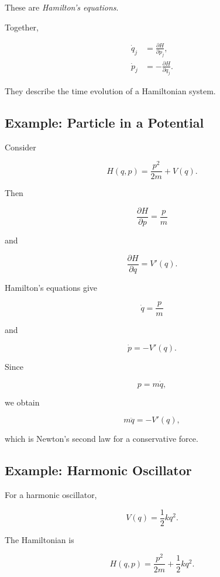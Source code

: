 These are \emph{Hamilton's equations}.

Together,

\[
\boxed{
\begin{aligned}
\dot q_j&=\frac{\partial H}{\partial p_j},\\
\dot p_j&=-\frac{\partial H}{\partial q_j}.
\end{aligned}
}
\]

They describe the time evolution of a Hamiltonian system.

\subsection{Example: Particle in a Potential}
\label{subsec:hamiltonian-particle-potential}

Consider

\[
H(q,p)
=
\frac{p^2}{2m}
+
V(q).
\]

Then

\[
\frac{\partial H}{\partial p}
=
\frac{p}{m}
\]

and

\[
\frac{\partial H}{\partial q}
=
V'(q).
\]

Hamilton's equations give

\[
\boxed{
\dot q=\frac{p}{m}
}
\]

and

\[
\boxed{
\dot p=-V'(q).
}
\]

Since

\[
p=m\dot q,
\]

we obtain

\[
m\ddot q=-V'(q),
\]

which is Newton's second law for a conservative force.

\subsection{Example: Harmonic Oscillator}
\label{subsec:symplectic-harmonic-oscillator}

For a harmonic oscillator,

\[
V(q)=\frac12kq^2.
\]

The Hamiltonian is

\[
\boxed{
H(q,p)
=
\frac{p^2}{2m}
+
\frac12kq^2.
}
\]

